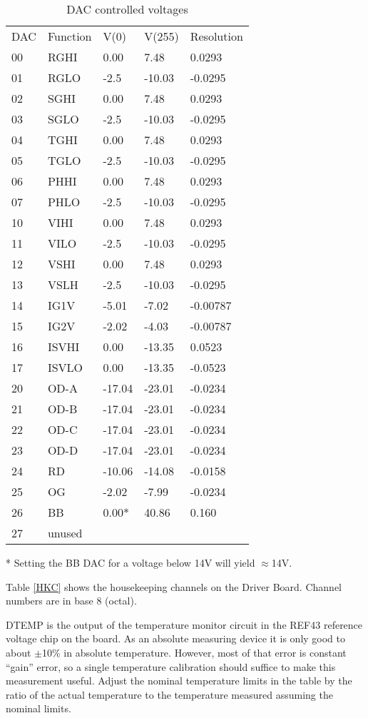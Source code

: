 \begin{table}[h]
\centering
\begin{tabular}{|l|l|l|l|l|}
\hline
DAC & Function & V(0) & V(255) & Resolution \\
00 & RGHI & 0.00 & 7.48 & 0.0293 \\
01 & RGLO & -2.5 & -10.03 & -0.0295 \\
02 & SGHI & 0.00 & 7.48 & 0.0293 \\
03 & SGLO & -2.5 & -10.03 & -0.0295 \\
04 & TGHI & 0.00 & 7.48 & 0.0293 \\
05 & TGLO & -2.5 & -10.03 & -0.0295 \\
06 & PHHI & 0.00 & 7.48 & 0.0293 \\
07 & PHLO & -2.5 & -10.03 & -0.0295 \\
10 & VIHI & 0.00 & 7.48 & 0.0293 \\
11 & VILO & -2.5 & -10.03 & -0.0295 \\
12 & VSHI & 0.00 & 7.48 & 0.0293 \\
13 & VSLH & -2.5 & -10.03 & -0.0295 \\
14 & IG1V & -5.01 & -7.02 & -0.00787 \\
15 & IG2V & -2.02 & -4.03 & -0.00787 \\
16 & ISVHI & 0.00 & -13.35 & 0.0523 \\
17 & ISVLO & 0.00 & -13.35 & -0.0523 \\
20 & OD-A & -17.04 & -23.01 & -0.0234 \\
21 & OD-B & -17.04 & -23.01 & -0.0234 \\
22 & OD-C & -17.04 & -23.01 & -0.0234 \\
23 & OD-D & -17.04 & -23.01 & -0.0234 \\
24 & RD & -10.06 & -14.08 & -0.0158 \\
25 & OG & -2.02 & -7.99 & -0.0234 \\
26 & BB & 0.00* & 40.86 & 0.160 \\
27 & unused & & & \\
\hline
\end{tabular}
\caption{DAC controlled voltages}
\label{DACV}
\end{table}
* Setting the BB DAC for a voltage below 14V will yield $\approx$14V.

Table \ref{HKC} shows the housekeeping channels on the Driver Board. Channel numbers are in base 8 (octal). 

DTEMP is the output of the temperature monitor circuit in the REF43 reference voltage chip on the board. As an absolute measuring device it is only good to about $\pm$10\% in absolute temperature. However, most of that error is constant ``gain'' error, so a single temperature calibration should suffice to make this measurement useful. Adjust the nominal temperature limits in the table by the ratio of the actual temperature to the temperature measured assuming the nominal limits.

